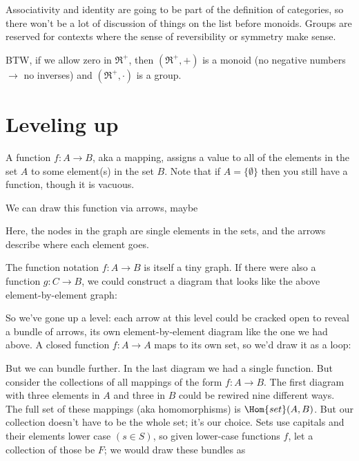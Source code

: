 \documentclass[11pt]{article}
\begin{document}
Associativity and identity are going to be part of the definition of categories,
so there won't be a lot of discussion of things on the list before monoids.
Groups are reserved for contexts where the sense of reversibility or symmetry make sense.

BTW, if we allow zero in $\Re^+$, then $(\Re^+, +)$ is a monoid (no negative numbers
$\rightarrow$ no inverses) and $(\Re^+, \cdot)$ is a group.

\section{Leveling up}\label{levelsec}

A function $f:A\to B$, aka a mapping, assigns a value to all of the elements in the set $A$ to
some element(s) in the set $B$. Note that if $A=\{\emptyset\}$ then you still have a function, though
it is vacuous.

We can draw this function via arrows, maybe

\begin{center}
\end{center}

Here, the nodes in the graph are single elements in the sets, and the arrows describe
where each element goes.

The function notation $f:A\to B$ is itself a tiny graph. If there were also a function
$g:C\to B$, we could construct a diagram that looks like the above element-by-element graph:

So we've gone up a level: each arrow at this level could be cracked open to reveal
a bundle of arrows, its own element-by-element diagram like the one we had above. A
closed function $f:A\to A$ maps to its own set, so we'd draw it as a loop:


But we can bundle further. In the last diagram we had a single function. But
consider the collections of all
mappings of the form $f:A\to B$. The first diagram with three elements in $A$ and
three in $B$ could be rewired nine different ways. The full set of these mappings (aka
homomorphisms) is $\Hom{set}(A, B)$. But our collection doesn't have to be the whole set;
it's our choice. Sets use capitals and their elements lower case $(s\in S)$, so
given lower-case functions $f$, let a collection of those be $F$; we would draw these
bundles as
\end{document}
